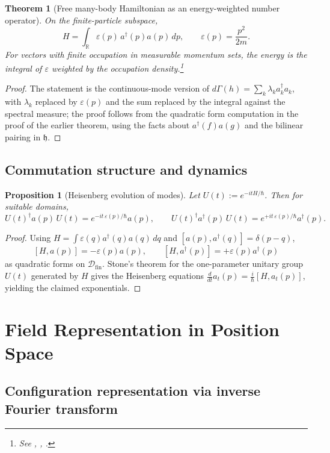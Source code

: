 \documentclass[11pt]{article}
\theoremstyle{definition}
\theoremstyle{plain}
\newtheorem{theorem}{Theorem}
\newtheorem{proposition}{Proposition}
\numberwithin{equation}{section}
\begin{document}
\begin{theorem}[Free many-body Hamiltonian as an energy-weighted number operator]
On the finite-particle subspace,
\[
H=\int_{\mathbb{R}}\varepsilon(p)\,a^\dagger(p)a(p)\,dp,\qquad \varepsilon(p)=\frac{p^2}{2m}.
\]
For vectors with finite occupation in measurable momentum sets, the energy is the integral of $\varepsilon$ weighted by the occupation density.\footnote{See \cite[Sec.~1.4]{uiuc561}, \cite{scholarpedia}, \cite[Sec.~4.3]{libresecond}.}
\end{theorem}

\begin{proof}
The statement is the continuous-mode version of $d\Gamma(h)=\sum_k \lambda_k a_k^\dagger a_k$, with $\lambda_k$ replaced by $\varepsilon(p)$ and the sum replaced by the integral against the spectral measure; the proof follows from the quadratic form computation in the proof of the earlier theorem, using the facts about $a^\dagger(f)a(g)$ and the bilinear pairing in $\mathfrak{h}$.\end{proof}

\subsection{Commutation structure and dynamics}

\begin{proposition}[Heisenberg evolution of modes]
Let $U(t):=e^{-itH/\hbar}$. Then for suitable domains,
\[
U(t)^\dagger a(p)\,U(t)=e^{-it\,\varepsilon(p)/\hbar} a(p),\qquad U(t)^\dagger a^\dagger(p)\,U(t)=e^{+it\,\varepsilon(p)/\hbar} a^\dagger(p).
\]
\end{proposition}

\begin{proof}
Using $H=\int \varepsilon(q)a^\dagger(q)a(q)\,dq$ and $[a(p),a^\dagger(q)]=\delta(p-q)$,
\[
[H,a(p)]=-\varepsilon(p)a(p),\qquad [H,a^\dagger(p)]=+\varepsilon(p)a^\dagger(p)
\]
as quadratic forms on $\mathcal{D}_{\mathrm{fin}}$. Stone’s theorem for the one-parameter unitary group $U(t)$ generated by $H$ gives the Heisenberg equations $\frac{d}{dt} a_t(p)=\frac{i}{\hbar}[H,a_t(p)]$, yielding the claimed exponentials.\end{proof}

\section{Field Representation in Position Space}

\subsection{Configuration representation via inverse Fourier transform}
\end{document}
